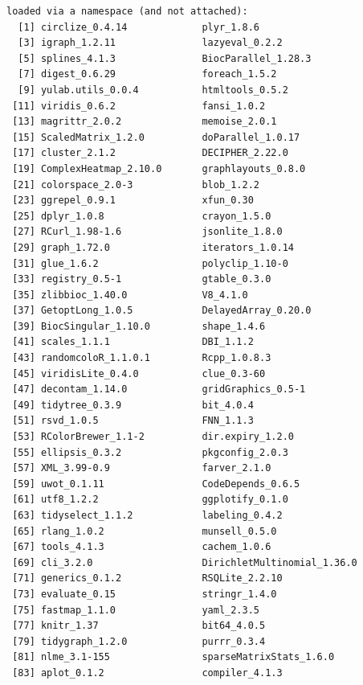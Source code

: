 \documentclass[
]{book}
\begin{document}
\begin{verbatim}
loaded via a namespace (and not attached):
  [1] circlize_0.4.14             plyr_1.8.6                 
  [3] igraph_1.2.11               lazyeval_0.2.2             
  [5] splines_4.1.3               BiocParallel_1.28.3        
  [7] digest_0.6.29               foreach_1.5.2              
  [9] yulab.utils_0.0.4           htmltools_0.5.2            
 [11] viridis_0.6.2               fansi_1.0.2                
 [13] magrittr_2.0.2              memoise_2.0.1              
 [15] ScaledMatrix_1.2.0          doParallel_1.0.17          
 [17] cluster_2.1.2               DECIPHER_2.22.0            
 [19] ComplexHeatmap_2.10.0       graphlayouts_0.8.0         
 [21] colorspace_2.0-3            blob_1.2.2                 
 [23] ggrepel_0.9.1               xfun_0.30                  
 [25] dplyr_1.0.8                 crayon_1.5.0               
 [27] RCurl_1.98-1.6              jsonlite_1.8.0             
 [29] graph_1.72.0                iterators_1.0.14           
 [31] glue_1.6.2                  polyclip_1.10-0            
 [33] registry_0.5-1              gtable_0.3.0               
 [35] zlibbioc_1.40.0             V8_4.1.0                   
 [37] GetoptLong_1.0.5            DelayedArray_0.20.0        
 [39] BiocSingular_1.10.0         shape_1.4.6                
 [41] scales_1.1.1                DBI_1.1.2                  
 [43] randomcoloR_1.1.0.1         Rcpp_1.0.8.3               
 [45] viridisLite_0.4.0           clue_0.3-60                
 [47] decontam_1.14.0             gridGraphics_0.5-1         
 [49] tidytree_0.3.9              bit_4.0.4                  
 [51] rsvd_1.0.5                  FNN_1.1.3                  
 [53] RColorBrewer_1.1-2          dir.expiry_1.2.0           
 [55] ellipsis_0.3.2              pkgconfig_2.0.3            
 [57] XML_3.99-0.9                farver_2.1.0               
 [59] uwot_0.1.11                 CodeDepends_0.6.5          
 [61] utf8_1.2.2                  ggplotify_0.1.0            
 [63] tidyselect_1.1.2            labeling_0.4.2             
 [65] rlang_1.0.2                 munsell_0.5.0              
 [67] tools_4.1.3                 cachem_1.0.6               
 [69] cli_3.2.0                   DirichletMultinomial_1.36.0
 [71] generics_0.1.2              RSQLite_2.2.10             
 [73] evaluate_0.15               stringr_1.4.0              
 [75] fastmap_1.1.0               yaml_2.3.5                 
 [77] knitr_1.37                  bit64_4.0.5                
 [79] tidygraph_1.2.0             purrr_0.3.4                
 [81] nlme_3.1-155                sparseMatrixStats_1.6.0    
 [83] aplot_0.1.2                 compiler_4.1.3             

\end{verbatim}
\end{document}
